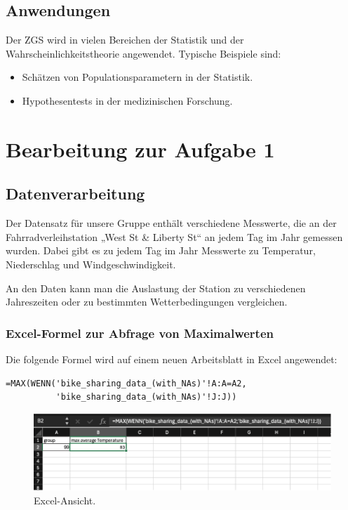 \documentclass[a4paper,12pt]{article}
\begin{document}
\subsection{Anwendungen}
Der ZGS wird in vielen Bereichen der Statistik und der Wahrscheinlichkeitstheorie angewendet. Typische Beispiele sind:
\begin{itemize}
    \item Schätzen von Populationsparametern in der Statistik.
    \item Hypothesentests in der medizinischen Forschung.
\end{itemize}

\newpage

\section{Bearbeitung zur Aufgabe 1}

\subsection{Datenverarbeitung}
Der Datensatz für unsere Gruppe enthält verschiedene Messwerte, die an der Fahrradverleihstation „West St \& Liberty St“ an jedem Tag im Jahr gemessen wurden. Dabei gibt es zu jedem Tag im Jahr Messwerte zu Temperatur, Niederschlag und Windgeschwindigkeit.

An den Daten kann man die Auslastung der Station zu verschiedenen Jahreszeiten oder zu bestimmten Wetterbedingungen vergleichen.

\subsubsection{Excel-Formel zur Abfrage von Maximalwerten}
Die folgende Formel wird auf einem neuen Arbeitsblatt in Excel angewendet:

\begin{verbatim}
=MAX(WENN('bike_sharing_data_(with_NAs)'!A:A=A2, 
          'bike_sharing_data_(with_NAs)'!J:J))
\end{verbatim}


\begin{figure}[h!]
    \centering
\includegraphics[width=\textwidth]{Comet_Snap_1.png}
    \caption{Excel-Ansicht.}
    \label{fig:example}
\end{figure}
\end{document}
